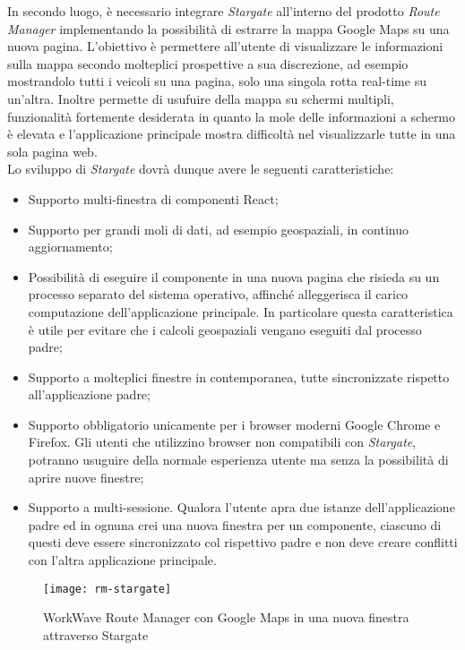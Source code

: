 In secondo luogo, è necessario integrare \textit{Stargate} all'interno del prodotto \textit{Route Manager} implementando la possibilità di estrarre la mappa Google Maps su una nuova pagina. L'obiettivo è permettere all'utente di visualizzare le informazioni sulla mappa secondo molteplici prospettive a sua discrezione, ad esempio mostrandolo tutti i veicoli su una pagina, solo una singola rotta real-time su un'altra. Inoltre permette di usufuire della mappa su schermi multipli, funzionalità fortemente desiderata in quanto la mole delle informazioni a schermo è elevata e l'applicazione principale mostra difficoltà nel visualizzarle tutte in una sola pagina web.\\

Lo sviluppo di \textit{Stargate} dovrà dunque avere le seguenti caratteristiche:

\begin{itemize}
    \item Supporto multi-finestra di componenti React;
    \item Supporto per grandi moli di dati, ad esempio geospaziali, in continuo aggiornamento;
    \item Possibilità di eseguire il componente in una nuova pagina che risieda su un processo separato del sistema operativo, affinché alleggerisca il carico computazione dell'applicazione principale. In particolare questa caratteristica è utile per evitare che i calcoli geospaziali vengano eseguiti dal processo padre;
    \item Supporto a molteplici finestre in contemporanea, tutte sincronizzate rispetto all'applicazione padre;
    \item Supporto obbligatorio unicamente per i browser moderni Google Chrome e Firefox. Gli utenti che utilizzino browser non compatibili con \textit{Stargate}, potranno usuguire della normale esperienza utente ma senza la possibilità di aprire nuove finestre;
    \item Supporto a multi-sessione. Qualora l'utente apra due istanze dell'applicazione padre ed in ognuna crei una nuova finestra per un componente, ciascuno di questi deve essere sincronizzato col rispettivo padre e non deve creare conflitti con l'altra applicazione principale.
\end{itemize}

\begin{figure}[H] 
    \centering 
    \texttt{[image: rm-stargate]} 
    \caption{WorkWave Route Manager con Google Maps in una nuova finestra attraverso Stargate}
\end{figure}
  
